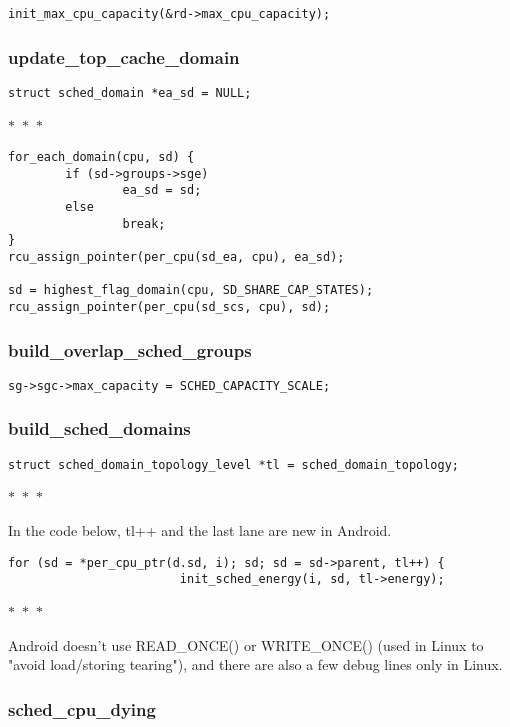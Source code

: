 \documentclass{article}
\newcommand{\divider}{{\begin{center}
  $\ast$~$\ast$~$\ast$
\end{center}}}
\begin{document}
\begin{verbatim}
init_max_cpu_capacity(&rd->max_cpu_capacity);
\end{verbatim}

\subsubsection{update\_top\_cache\_domain}

\begin{verbatim}
struct sched_domain *ea_sd = NULL;
\end{verbatim}
\divider
\begin{verbatim}
for_each_domain(cpu, sd) {
        if (sd->groups->sge)
                ea_sd = sd;
        else
                break;
}
rcu_assign_pointer(per_cpu(sd_ea, cpu), ea_sd);

sd = highest_flag_domain(cpu, SD_SHARE_CAP_STATES);
rcu_assign_pointer(per_cpu(sd_scs, cpu), sd);
\end{verbatim}

\subsubsection{build\_overlap\_sched\_groups}

\begin{verbatim}
sg->sgc->max_capacity = SCHED_CAPACITY_SCALE;
\end{verbatim}

\subsubsection{build\_sched\_domains}

\begin{verbatim}
struct sched_domain_topology_level *tl = sched_domain_topology;
\end{verbatim}
\divider
In the code below, tl++ and the last lane are new in Android.
\begin{verbatim}
for (sd = *per_cpu_ptr(d.sd, i); sd; sd = sd->parent, tl++) { 
                        init_sched_energy(i, sd, tl->energy);
\end{verbatim}
\divider
Android doesn't use READ\_ONCE() or WRITE\_ONCE() (used in Linux to "avoid load/storing tearing"), and there are also a few debug lines only in Linux.

\subsubsection{sched\_cpu\_dying}
\end{document}
